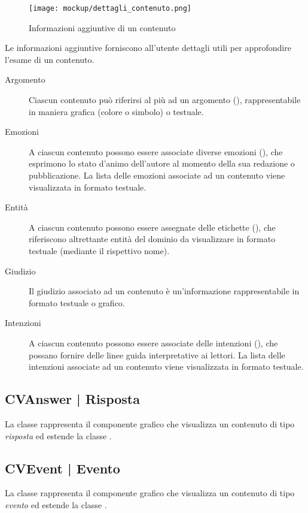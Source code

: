 \documentclass[10pt,a4paper,headinclude,footinclude,hidelinks]{scrreprt} %
\begin{document}
	\begin{figure}[ht]
		\begin{center}
	    	\texttt{[image: mockup/dettagli\_contenuto.png]}
			\label{gfx:mockup:content-details}
			\caption{Informazioni aggiuntive di un contenuto}
		\end{center}
	\end{figure}

	Le informazioni aggiuntive forniscono all'utente dettagli utili per approfondire l'esame di un contenuto.
	\begin{description}
	\item[Argomento] Ciascun contenuto può riferirsi al più ad un argomento (\textit{}), rappresentabile in maniera grafica (colore o simbolo) o testuale.
	\item[Emozioni] A ciascun contenuto possono essere associate diverse emozioni (\textit{}), che esprimono lo stato d'animo dell'autore al momento della sua redazione o pubblicazione. La lista delle emozioni associate ad un contenuto viene visualizzata in formato testuale.
	\item[Entit\`a] A ciascun contenuto possono essere assegnate delle etichette (\textit{}), che riferiscono altrettante entità del dominio da visualizzare in formato testuale (mediante il rispettivo nome).
	\item[Giudizio] Il giudizio associato ad un contenuto è un'informazione rappresentabile in formato testuale o grafico.
	\item[Intenzioni] A ciascun contenuto possono essere associate delle intenzioni (\textit{}), che possano fornire delle linee guida interpretative ai lettori. La lista delle intenzioni associate ad un contenuto viene visualizzata in formato testuale.
	\end{description}

	\subsection[CVAnswer]{CVAnswer | Risposta}
	\label{sec:stage:design:view:answer}
	La classe rappresenta il componente grafico che visualizza un contenuto di tipo \textit{risposta} ed estende la classe \textit{}.

	\subsection[CVEvent]{CVEvent | Evento}
	\label{sec:stage:design:view:event}
	La classe rappresenta il componente grafico che visualizza un contenuto di tipo \textit{evento} ed estende la classe \textit{}.
\end{document}
